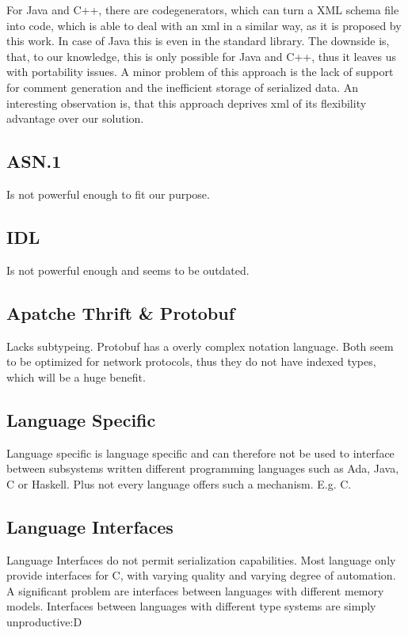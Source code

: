\documentclass[a4paper,10pt]{article}
\begin{document}
For Java and C++, there are codegenerators, which can turn a XML schema file into code, which is able to deal with an xml in a similar way, as it is proposed by this work. In case of Java this is even in the standard library. The downside is, that, to our knowledge, this is only possible for Java and C++, thus it leaves us with portability issues. A minor problem of this approach is the lack of support for comment generation and the inefficient storage of serialized data.
An interesting observation is, that this approach deprives xml of its flexibility advantage over our solution. 


\subsection*{ASN.1}

Is not powerful enough to fit our purpose.

\subsection*{IDL}

 Is not powerful enough and seems to be outdated.


\subsection*{Apatche Thrift \& Protobuf}

Lacks subtypeing. Protobuf has a overly complex notation language. Both seem to be optimized for network protocols, thus they do not have indexed types, which will be a huge benefit. 


\subsection*{Language Specific}

Language specific is language specific and can therefore not be used to interface between subsystems written different programming languages such as Ada, Java, C or Haskell. Plus not every language offers such a mechanism. E.g. C.


\subsection*{Language Interfaces}
Language Interfaces do not permit serialization capabilities. Most language only provide interfaces for C, with varying quality and varying degree of automation. A significant problem are interfaces between languages with different memory models.
Interfaces between languages with different type systems are simply unproductive:D
\end{document}
